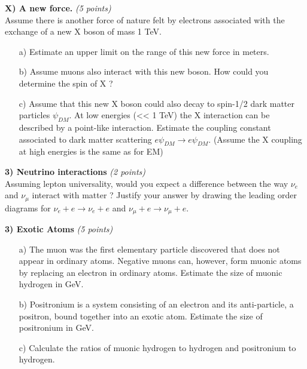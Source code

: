 {\textbf{X) A new force. } \hfill \textit{(5 points)}\\
Assume there is another force of nature felt by electrons associated with the exchange of a new X boson of mass 1 TeV.
\begin{itemize}
\item[a)]{ Estimate an upper limit on the range of this new force in meters.}
\item[b)]{ Assume muons also interact with this new boson. How could you determine the spin of X ?}
\item[c)]{ Assume that this new X boson could also decay to spin-1/2 dark matter particles $\psi_{DM}$. At low energies (<< 1 TeV) the X interaction can be described by a point-like interaction. Estimate the coupling constant associated to dark matter scattering $e \psi_{DM} \rightarrow e \psi_{DM}$.   (Assume the X coupling at high energies is the same as for EM)  }
\end{itemize}

\textbf{3) Neutrino interactions } \hfill \textit{(2 points)}\\
Assuming lepton universality, would you expect a difference between the way $\nu_e$ and $\nu_\mu$ interact with matter ?
Justify your answer by drawing the leading order diagrams for $\nu_e + e \rightarrow \nu_e + e$  and $\nu_\mu + e \rightarrow \nu_\mu + e$.

\vspace*{0.25in}




\textbf{3) Exotic Atoms } \hfill \textit{(5 points)}\\
\begin{itemize}
\item[a)]{
The muon was the first elementary particle discovered that does not appear in ordinary atoms.
Negative muons can, however, form muonic atoms by replacing an electron in ordinary atoms. 
Estimate the size of muonic hydrogen in GeV.  
}
\item[b)]{
Positronium is a system consisting of an electron and its anti-particle, a positron, bound together into an exotic atom.
Estimate the size of positronium in GeV. 
}
\item[c)]{
Calculate the ratios of muonic hydrogen to hydrogen and positronium to hydrogen.
}
\end{itemize}


} %


